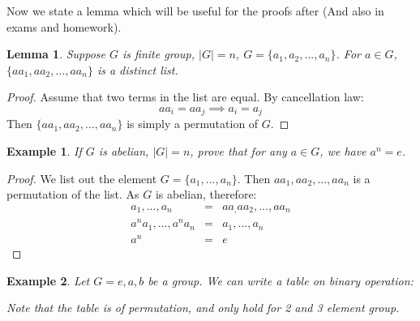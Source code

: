 \documentclass{article}
\theoremstyle{MyNonumberplain}
\theoremstyle{break}
\newtheorem*{proof}{Proof. }
\theoremstyle{break}
\newtheorem{example}{Example}[section]
\newtheorem{lemma}[theorem]{Lemma}
\theoremstyle{break}
\theoremstyle{definition}
\theoremstyle{break}
\begin{document}
Now we state a lemma which will be useful for the proofs after (And also in exams and homework).

\begin{thmbox}
    \begin{lemma}
        Suppose $G$ is finite group, $| G | = n$, $G = \{ a_1, a_2, \ldots, a_n \}$.
        For $a \in G$, $\{ a a_1, a a_2, \ldots, a a_n \}$ is a distinct list.
    \end{lemma}
    \begin{prfbox}
        \begin{proof}
            Assume that two terms in the list are equal. By cancellation law:
            $$aa_i=aa_j\implies a_i=a_j$$
            Then $\{ a a_1, a a_2, \ldots, a a_n \}$ is simply a permutation of $G$.
        \end{proof}
    \end{prfbox}
\end{thmbox}

\begin{expbox}
    \begin{example}
        If $G$ is abelian, $| G | = n$, prove that for any $a \in G$, we have $a^n =e$.
    \end{example}
    \begin{prfbox}
        
    \begin{proof}
        We list out the element $G=\{a_1,...,a_n\}$. Then $aa_1,aa_2,...,aa_n$ is a permutation of the list.
        As $G$ is abelian, therefore:
        \begin{eqnarray*}
            a_1,...,a_n & = & aa_,aa_2,...,aa_n\\
            a^na_1,...,a^na_n & = & a_1,...,a_n\\
            a^n & = & e
        \end{eqnarray*}
    \end{proof} 
\end{prfbox}
\end{expbox}

\begin{expbox}
    \begin{example}
        Let $G={e,a,b}$ be a group. We can write a table on binary operation:
        \begin{center}
            {}
        \end{center}
        Note that the table is of permutation, and only hold for 2 and 3 element group.
    \end{example}
\end{expbox}
\end{document}
